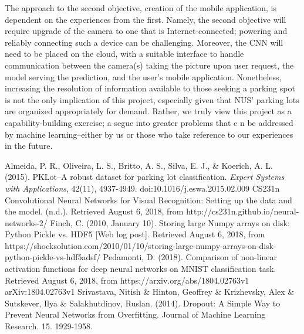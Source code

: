 \documentclass[a4paper, 11pt]{article} %
\begin{document}
	The approach to the second objective, creation of the mobile application, is
	dependent on the experiences from the first. Namely, the second objective will
	require upgrade of the camera to one that is Internet-connected; powering and
	reliably connecting such a device can be challenging.  Moreover, the CNN will
	need to be placed on the cloud, with a suitable interface to handle
	communication between the camera(s) taking the picture upon user request, the
	 model serving the prediction, and the user's mobile application.
	  Nonetheless, increasing the
	resolution of information available to those seeking a parking spot is not the
	only implication of this project, especially given that NUS' parking lots are
	organized appropriately for demand. Rather, we truly view this project as a
	capability-building exercise; a segue into greater problems that c n be
	addressed by machine learning--either by us or those who take reference to our
	experiences in the future.

\newpage
\begin{thebibliography}{unsrt}
		Almeida, P. R., Oliveira, L. S., Britto, A. S., Silva, E. J., \& Koerich, A. L. (2015). PKLot--A robust 
		dataset for parking lot classification. \textit{Expert Systems with Applications}, 42(11), 
		4937-4949. doi:10.1016/j.eswa.2015.02.009
		CS231n Convolutional Neural Networks for Visual Recognition: Setting up 
		the data and the model. (n.d.). Retrieved August 6, 2018, from 
		http://cs231n.github.io/neural-networks-2/	
		Finch, C. (2010, January 10). Storing large Numpy arrays on disk: 
		Python Pickle vs. HDF5 [Web log post]. Retrieved August 6, 2018, from 
		https://shocksolution.com/2010/01/10/storing-large-numpy-arrays-on-disk-python-pickle-vs-hdf5adsf/
		Pedamonti, D. (2018). Comparison of non-linear activation functions for 
		deep neural networks on MNIST classification task. Retrieved August 6, 
		2018, from https://arxiv.org/abs/1804.02763v1 arXiv:1804.02763v1
		Srivastava, Nitish \& Hinton, Geoffrey \& Krizhevsky, Alex \& 
		Sutskever, Ilya \& Salakhutdinov, Ruslan. (2014). Dropout: A Simple Way 
		to Prevent Neural Networks from Overfitting. Journal of Machine 
		Learning Research. 15. 1929-1958.
\end{thebibliography}
\end{document}

